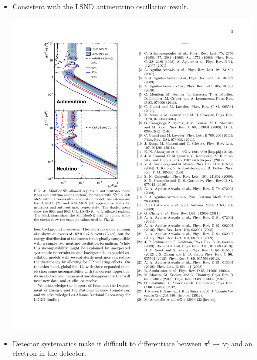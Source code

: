 \documentclass[mathserif,18pt,xcolor=table]{beamer}
\begin{document}
\begin{frame}
{\begin{columns}
\begin{column}{.5\linewidth}
\begin{itemize}
        \item Consistent with the LSND antineutrino oscillation result.
          \begin{center}
            \includegraphics[width=.6\linewidth]{../figures/miniboone_regions.pdf}
          \end{center}
        \item Detector systematics make it difficult to differentiate between $\pi^0\rightarrow\gamma\gamma$ and an electron in the detector.
        \end{itemize}
      \end{column}
    \end{columns}
  }
\end{frame}
\end{document}
